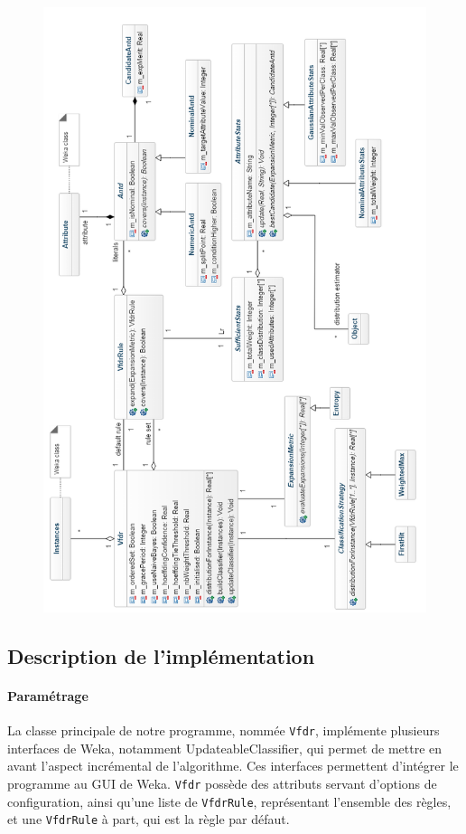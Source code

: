     \begin{figure}

        \includegraphics[width=\textwidth]{SOURCES/image2}

    \end{figure}


    \subsection{Description de l'implémentation}

        \paragraph{Paramétrage} La classe principale de notre programme, nommée \texttt{Vfdr}, implémente plusieurs interfaces de Weka, notamment UpdateableClassifier, qui permet de mettre en avant l’aspect incrémental de l’algorithme. Ces interfaces permettent d'intégrer le programme au GUI de Weka. \texttt{Vfdr} possède des attributs servant d’options de configuration, ainsi qu’une liste de \texttt{VfdrRule}, représentant l’ensemble des règles, et une \texttt{VfdrRule} à part, qui est la règle par défaut.

